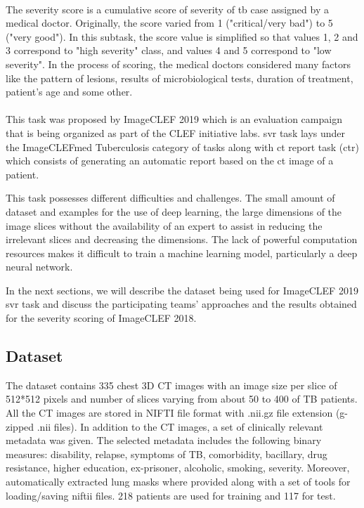 \paragraph{}
The severity score is a cumulative score of severity of \acs{tb} case assigned by a medical doctor. Originally, the score varied from 1 ("critical/very bad") to 5 ("very good"). In this subtask, the score value is simplified so that values 1, 2 and 3 correspond to "high severity" class, and values 4 and 5 correspond to "low severity". In the process of scoring, the medical doctors considered many factors like the pattern of lesions, results of microbiological tests, duration of treatment, patient's age and some other.
\paragraph{}
This task was proposed by ImageCLEF 2019 which is an evaluation campaign that is being organized as part of the CLEF initiative labs. \acs{svr} task lays under the ImageCLEFmed Tuberculosis category of tasks along with \acs{ct} report task (\acs{ctr}) which consists of generating an automatic report based on the \acs{ct} image of a patient.

This task possesses different difficulties and challenges. The small amount of dataset and examples for the use of deep learning, the large dimensions of the image slices without the availability of an expert to assist in reducing the irrelevant slices and decreasing the dimensions. The lack of powerful computation resources makes it difficult to train a machine learning model, particularly a deep neural network.

In the next sections, we will describe the dataset being used for ImageCLEF 2019 \acs{svr} task and discuss the participating teams' approaches and the results obtained for the severity scoring of ImageCLEF 2018.

\subsection{Dataset}
The dataset contains 335 chest 3D CT images with an image size per slice of 512*512 pixels and number of slices varying from about 50 to 400 of TB patients. All the CT images are stored in NIFTI file format with .nii.gz file extension (g-zipped .nii files). In addition to the CT images, a set of clinically relevant metadata was given. The selected metadata includes the following binary measures: disability, relapse, symptoms of TB, comorbidity, bacillary, drug resistance, higher education, ex-prisoner, alcoholic, smoking, severity. Moreover, automatically extracted lung masks where provided along with a set of tools for loading/saving niftii files. 218 patients are used for training and 117 for test.
